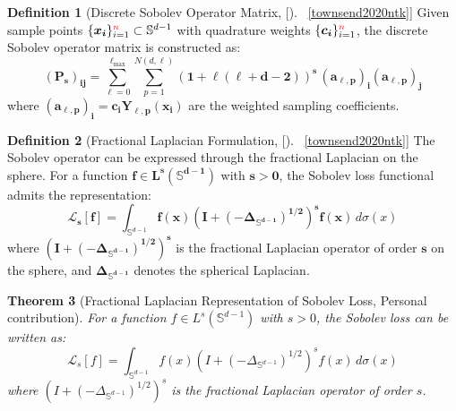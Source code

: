 \documentclass[a4paper]{article}
\theoremstyle{plain}
\newtheorem{theorem}{Theorem}[section]
\theoremstyle{definition}
\newtheorem{definition}[theorem]{Definition}
\theoremstyle{remark}
\begin{document}
\begin{definition}[Discrete Sobolev Operator Matrix, []~\ref{townsend2020ntk}]
\label{def:sobolev_discrete}
Given sample points $\{\boldsymbol{x_i}\}_{i=1}^{\textcolor{red}{n}} \subset \mathbb{S}^{d-1}$ with quadrature weights $\{\boldsymbol{c_i}\}_{i=1}^{\textcolor{red}{n}}$, the discrete Sobolev operator matrix is constructed as:
\begin{equation}
\label{eq:sobolev_discrete}
\boldsymbol{(P_s)_{ij}} = \sum_{\ell=0}^{\ell_{\max}} \sum_{p=1}^{N(d,\ell)} \boldsymbol{(1 + \ell(\ell + d - 2))^s} \, \boldsymbol{(a_{\ell,p})_i} \boldsymbol{(a_{\ell,p})_j}
\end{equation}
where $\boldsymbol{(a_{\ell,p})_i} = \boldsymbol{c_i} \boldsymbol{Y_{\ell,p}(x_i)}$ are the weighted sampling coefficients.
\end{definition}

\begin{definition}[Fractional Laplacian Formulation, []~\ref{townsend2020ntk}]
\label{def:fractional_laplacian}
The Sobolev operator can be expressed through the fractional Laplacian on the sphere. For a function $\boldsymbol{f \in L^s(\mathbb{S}^{d-1})}$ with $\boldsymbol{s > 0}$, the Sobolev loss functional admits the representation:
\begin{equation}
\label{eq:fractional_laplacian}
\boldsymbol{\mathcal{L}_s[f]} = \int_{\mathbb{S}^{d-1}} \boldsymbol{f(x)} \boldsymbol{(I + (-\Delta_{\mathbb{S}^{d-1}})^{1/2})^s} \boldsymbol{f(x)} \, d\sigma(x)
\end{equation}
where $\boldsymbol{(I + (-\Delta_{\mathbb{S}^{d-1}})^{1/2})^s}$ is the fractional Laplacian operator of order $\boldsymbol{s}$ on the sphere, and $\boldsymbol{\Delta_{\mathbb{S}^{d-1}}}$ denotes the spherical Laplacian.
\end{definition}

\begin{theorem}[Fractional Laplacian Representation of Sobolev Loss, Personal contribution]
\label{thm:fractional_sobolev}
For a function $f \in L^s(\mathbb{S}^{d-1})$ with $s > 0$, the Sobolev loss can be written as:
\begin{equation}
\label{eq:sobolev_fractional_rep}
\mathcal{L}_s[f] = \int_{\mathbb{S}^{d-1}} f(x) (I + (-\Delta_{\mathbb{S}^{d-1}})^{1/2})^s f(x) \, d\sigma(x)
\end{equation}
where $(I + (-\Delta_{\mathbb{S}^{d-1}})^{1/2})^s$ is the fractional Laplacian operator of order $s$.
\end{theorem}
\end{document}
